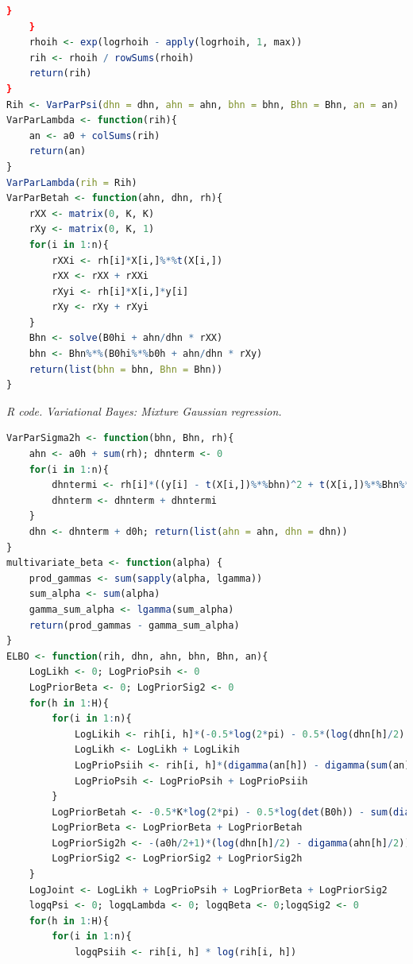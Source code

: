 \begin{enumerate}[leftmargin=*]
\begin{tcolorbox}[enhanced,width=4.67in,center upper,
	fontupper=\large\bfseries,drop shadow southwest,sharp corners]
\begin{VF}
\begin{lstlisting}[language=R]
		}
	}
	rhoih <- exp(logrhoih - apply(logrhoih, 1, max)) 
	rih <- rhoih / rowSums(rhoih)
	return(rih)
}
Rih <- VarParPsi(dhn = dhn, ahn = ahn, bhn = bhn, Bhn = Bhn, an = an)
VarParLambda <- function(rih){
	an <- a0 + colSums(rih)
	return(an)
}
VarParLambda(rih = Rih)
VarParBetah <- function(ahn, dhn, rh){
	rXX <- matrix(0, K, K)
	rXy <- matrix(0, K, 1)
	for(i in 1:n){
		rXXi <- rh[i]*X[i,]%*%t(X[i,])
		rXX <- rXX + rXXi
		rXyi <- rh[i]*X[i,]*y[i]
		rXy <- rXy + rXyi
	}
	Bhn <- solve(B0hi + ahn/dhn * rXX)
	bhn <- Bhn%*%(B0hi%*%b0h + ahn/dhn * rXy)
	return(list(bhn = bhn, Bhn = Bhn))
}
\end{lstlisting}
	\end{VF}
\end{tcolorbox}

\begin{tcolorbox}[enhanced,width=4.67in,center upper,
	fontupper=\large\bfseries,drop shadow southwest,sharp corners]
	\textit{R code. Variational Bayes: Mixture Gaussian regression.}
	\begin{VF}
		\begin{lstlisting}[language=R]
VarParSigma2h <- function(bhn, Bhn, rh){
	ahn <- a0h + sum(rh); dhnterm <- 0
	for(i in 1:n){
		dhntermi <- rh[i]*((y[i] - t(X[i,])%*%bhn)^2 + t(X[i,])%*%Bhn%*%X[i,])
		dhnterm <- dhnterm + dhntermi
	}
	dhn <- dhnterm + d0h; return(list(ahn = ahn, dhn = dhn))
}
multivariate_beta <- function(alpha) {
	prod_gammas <- sum(sapply(alpha, lgamma))
	sum_alpha <- sum(alpha)
	gamma_sum_alpha <- lgamma(sum_alpha)
	return(prod_gammas - gamma_sum_alpha)
}
ELBO <- function(rih, dhn, ahn, bhn, Bhn, an){
	LogLikh <- 0; LogPrioPsih <- 0
	LogPriorBeta <- 0; LogPriorSig2 <- 0
	for(h in 1:H){
		for(i in 1:n){
			LogLikih <- rih[i, h]*(-0.5*log(2*pi) - 0.5*(log(dhn[h]/2) - digamma(ahn[h]/2)) - 0.5*(ahn[h]/dhn[h])*((y[i] - t(X[i,])%*%bhn[,h])^2 + t(X[i,])%*%Bhn[,,h]%*%X[i,]))
			LogLikh <- LogLikh + LogLikih
			LogPrioPsiih <- rih[i, h]*(digamma(an[h]) - digamma(sum(an)))
			LogPrioPsih <- LogPrioPsih + LogPrioPsiih
		}
		LogPriorBetah <- -0.5*K*log(2*pi) - 0.5*log(det(B0h)) - sum(diag(Bhn[,,h]%*%B0hi)) - t(bhn[,h] - b0h)%*%B0hi%*%(bhn[,h] - b0h)
		LogPriorBeta <- LogPriorBeta + LogPriorBetah
		LogPriorSig2h <- -(a0h/2+1)*(log(dhn[h]/2) - digamma(ahn[h]/2)) - 0.5*d0h*(ahn[h]/dhn[h]) + (a0h/2)*log(d0h/2) - lgamma(a0h/2)
		LogPriorSig2 <- LogPriorSig2 + LogPriorSig2h  
	}
	LogJoint <- LogLikh + LogPrioPsih + LogPriorBeta + LogPriorSig2
	logqPsi <- 0; logqLambda <- 0; logqBeta <- 0;logqSig2 <- 0
	for(h in 1:H){
		for(i in 1:n){
			logqPsiih <- rih[i, h] * log(rih[i, h])

\end{lstlisting}
\end{VF}
\end{tcolorbox}
\end{enumerate}
